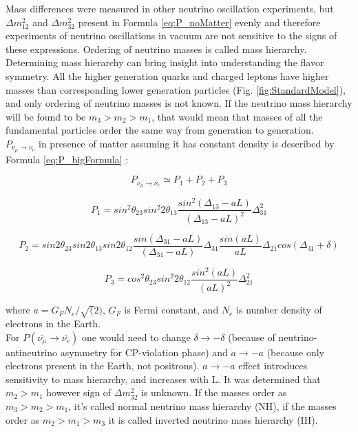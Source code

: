 Mass differences were measured in other neutrino oscillation experiments, but ${\Delta}m_{12}^2$ and ${\Delta}m_{32}^2$ present in Formula \ref{eq:P_noMatter} evenly and therefore experiments of neutrino oscillations in vacuum are not sensitive to the signs of these expressions. Ordering of neutrino masses is called mass hierarchy. Determining mass hierarchy can bring insight into understanding the flavor symmetry. All the higher generation quarks and charged leptons have higher masses than corresponding lower generation particles (Fig. \ref{fig:StandardModel}), and only ordering of neutrino masses is not known. If the neutrino mass hierarchy will be found to be $m_3>m_2>m_1$, that would mean that masses of all the fundamental particles order the same way from generation to generation. \\

$P_{\nu_\mu \rightarrow \nu_e}$ in presence of matter assuming it has constant density is described by Formula \ref{eq:P_bigFormula} \cite{ref_theory_Osc}: \\
\begin{center}

\begin{equation}
\label{eq:P_bigFormula}
P_{\nu_\mu \rightarrow \nu_e} \simeq P_1 + P_2 + P_3 
\end{equation}

\begin{equation}
\label{eq:P_bigFormula_1}
P_1 = sin^2{\theta_{23}}sin^2{2\theta_{13}}\frac{sin^2(\Delta_{13}-aL)}{(\Delta_{13}-aL)^2}\Delta^2_{31}
\end{equation}

\begin{equation}
\label{eq:P_bigFormula_2}
P_2 = sin2\theta_{23}sin2\theta_{13}sin2\theta_{12}\frac{sin(\Delta_{31}-aL)}{(\Delta_{31}-aL)}\Delta_{31}\frac{sin(aL)}{aL}\Delta_{21}cos(\Delta_{31}+\delta)
\end{equation}

\begin{equation}
\label{eq:P_bigFormula_3}
P_3 = cos^2\theta_{23}sin^2{2\theta_{12}}\frac{sin^2(aL)}{(aL)^2}\Delta^2_{21}
\end{equation}

\end{center}

where $a={G_F}{N_e}/\sqrt(2)$, $G_F$ is Fermi constant, and $N_e$ is number density of electrons in the Earth.\\

For $P(\bar{\nu_\mu} \rightarrow \bar{\nu_e})$ one would need to change $\delta \rightarrow -\delta$ (because of neutrino-antineutrino asymmetry for CP-violation phase) and $a \rightarrow -a$ (because only electrons present in the Earth, not positrons). $a \rightarrow -a$ effect introduces sensitivity to mass hierarchy, and increases with L. It was determined that $m_2>m_1$ however sign of ${\Delta}m_{32}^2$ is unknown. If the masses order as $m_3 > m_2 > m_1$, it's called normal neutrino mass hierarchy (NH), if the masses order as $m_2 > m_1 > m_3$ it is called inverted neutrino mass hierarchy (IH).\\

